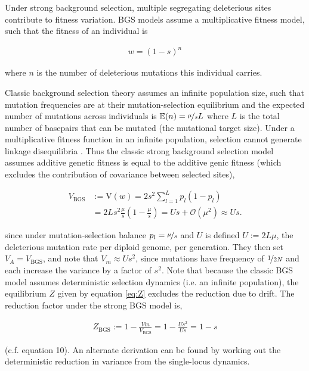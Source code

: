 \documentclass[11pt]{article}
\newcommand{\E}{\mathbb{E}}
\newcommand{\V}{\text{V}}
\newcommand{\V}{\text{V}}
\begin{document}
Under strong background selection, multiple segregating deleterious sites
contribute to fitness variation. BGS models assume a multiplicative fitness
model, such that the fitness of an individual is

\begin{align}
  w = (1-s)^{n}
\end{align}

where $n$ is the number of deleterious mutations this individual carries.

Classic background selection theory assumes an infinite population size, such
that mutation frequencies are at their mutation-selection equilibrium and the
expected number of mutations across individuals is $\E(n) = \nicefrac{\mu}{s}L$
where $L$ is the total number of basepairs that can be mutated (the mutational
target size).  Under a multiplicative fitness function in an infinite
population, selection cannot generate linkage disequilibria
\parencite{Turelli1990-kd}. Thus the classic strong background selection model
assumes additive genetic fitness is equal to the additive genic fitness (which
excludes the contribution of covariance between selected sites), 

\begin{align}
  \label{eq:va_bgs}
  V_\text{BGS} &:= \V(w) = 2 s^2 \sum_{l=1}^L p_l(1-p_l)  \\
            &= 2 L s^2 \frac{\mu}{s} \left( 1 - \frac{\mu}{s}\right) = U s + \mathcal{O}(\mu^2) \approx Us.
\end{align}

since under mutation-selection balance $p_l = \nicefrac{\mu}{s}$ and $U$ is
defined $U := 2 L \mu$, the deleterious mutation rate per diploid genome, per
generation. They then set $V_A = V_\text{BGS}$, and note that $V_m \approx
Us^2$, since mutations have frequency of $\nicefrac{1}{2N}$ and each increase
the variance by a factor of $s^2$. Note that because the classic BGS model
assumes deterministic selection dynamics (i.e. an infinite population), the
equilibrium $Z$ given by equation \eqref{eq:Z} excludes the reduction due to
drift. The reduction factor under the strong BGS model is,

\begin{align}
  Z_\text{BGS} := 1 - \frac{Vm}{V_\text{BGS}} = 1 - \frac{Us^2}{Us} = 1 - s
\end{align}

(c.f. \cite{Santiago1998-bs} equation 10). An alternate derivation can be found
by working out the deterministic reduction in variance from the single-locus
dynamics. 
\end{document}
